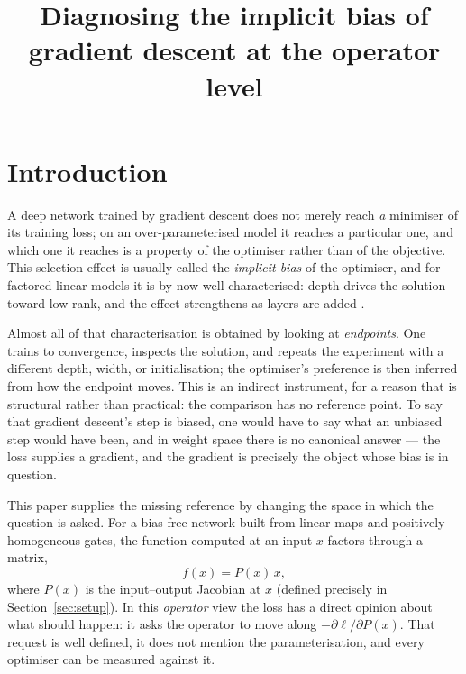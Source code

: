 \documentclass{article} %
\title{Diagnosing the implicit bias of gradient descent at the operator level}
\author{}
\theoremstyle{plain}
\theoremstyle{definition}
\theoremstyle{remark}
\begin{document}
\maketitle

\begin{abstract}
\end{abstract}

\section{Introduction}
\label{sec:intro}

A deep network trained by gradient descent does not merely reach \emph{a} minimiser of its
training loss; on an over-parameterised model it reaches a particular one, and which one it
reaches is a property of the optimiser rather than of the objective. This selection effect is
usually called the \emph{implicit bias} of the optimiser, and for factored linear models it is by
now well characterised: depth drives the solution toward low rank, and the effect strengthens as
layers are added \citep{gunasekar2017implicit,arora2019implicit,li2021towards}.

Almost all of that characterisation is obtained by looking at \emph{endpoints}. One trains to
convergence, inspects the solution, and repeats the experiment with a different depth, width, or
initialisation; the optimiser's preference is then inferred from how the endpoint moves. This is
an indirect instrument, for a reason that is structural rather than practical: the comparison has
no reference point. To say that gradient descent's step is biased, one would have to say what an
unbiased step would have been, and in weight space there is no canonical answer --- the loss
supplies a gradient, and the gradient is precisely the object whose bias is in question.

This paper supplies the missing reference by changing the space in which the question is asked.
For a bias-free network built from linear maps and positively homogeneous gates, the function
computed at an input $x$ factors through a matrix,
\begin{equation}
  f(x) = P(x)\,x ,
  \label{eq:fx}
\end{equation}
where $P(x)$ is the input--output Jacobian at $x$ (defined precisely in
Section~\ref{sec:setup}). In this \emph{operator} view the loss has a direct opinion about what
should happen: it asks the operator to move along $-\partial \ell/\partial P(x)$. That request is
well defined, it does not mention the parameterisation, and every optimiser can be measured
against it.
\end{document}
